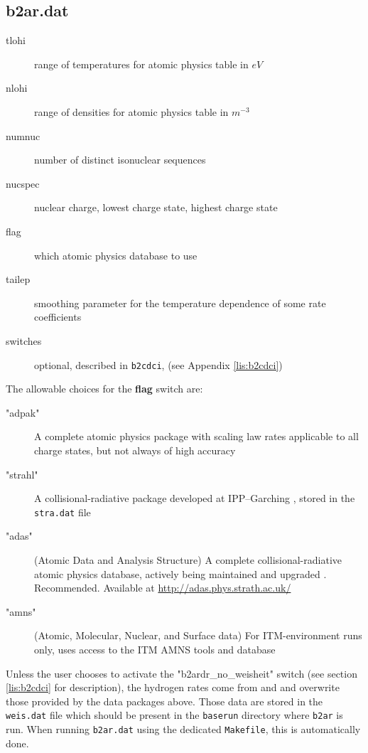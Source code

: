 \documentclass[a4paper,10pt]{report}
\begin{document}
\subsection{b2ar.dat}


\begin{description}
\item[tlohi] range of temperatures for atomic physics table in $eV$
\item[nlohi] range of densities for atomic physics table in $m^{-3}$
\item[numnuc] number of distinct isonuclear sequences
\item[nucspec] nuclear charge, lowest charge state, highest charge state
\item[flag] which atomic physics database to use
\item[tailep] smoothing parameter for the temperature dependence of some rate coefficients
\item[switches] optional, described in {\tt b2cdci}, (see Appendix \ref{lis:b2cdci})
\end{description}

The allowable choices for the {\bf flag} switch are:
\begin{description}
\item["adpak"] A complete atomic physics package with scaling law rates applicable to all charge states, but not always of high accuracy \cite{ADPAK}
\item["strahl"] A collisional-radiative package developed at IPP--Garching \cite{BEHRINGER87A}, stored in the {\tt stra.dat} file
\item["adas"] (Atomic Data and Analysis Structure) A complete collisional-radiative atomic physics database, actively being maintained and upgraded \cite{ADAS,ADAS2006}. Recommended. Available at \href{http://adas.phys.strath.ac.uk/}{http://adas.phys.strath.ac.uk/}
\item["amns"] (Atomic, Molecular, Nuclear, and Surface data) For ITM-environment runs only, uses access to the ITM AMNS tools and database
\end{description}

Unless the user chooses to activate the "b2ardr\_no\_weisheit" switch (see
section \ref{lis:b2cdci} for description), the hydrogen rates come from
\cite{Weisheit} and \cite{Janev1984} and overwrite those provided by the data packages above. Those
data are stored in the {\tt weis.dat} file which should be present in the
{\tt baserun} directory where {\tt b2ar} is run. When running {\tt b2ar.dat} using the
dedicated {\tt Makefile}, this is automatically done.
\end{document}
